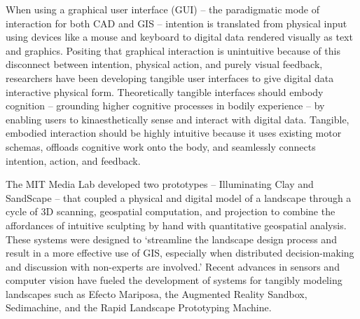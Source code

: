 \documentclass[Afour,sagev,times]{sagej} %
\begin{document}
When using a graphical user interface (GUI) 
-- the paradigmatic mode of interaction for both CAD and GIS --  
intention is translated from physical input 
using devices like a mouse and keyboard 
to digital data rendered visually as text and graphics. 
Positing that graphical interaction is unintuitive
because of this disconnect between 
intention, physical action, and purely visual feedback,
researchers have been developing tangible user interfaces 
to give digital data interactive physical form. 
\cite{Dourish2001,Ishii2008} 
Theoretically tangible interfaces should embody cognition 
-- grounding higher cognitive processes in bodily experience --
by enabling users to kinaesthetically sense and interact with digital data.
\cite{Kirsh2013}
Tangible, embodied interaction should be highly intuitive 
because it uses existing motor schemas,  
offloads cognitive work onto the body,
and seamlessly connects intention, action, and feedback.

The MIT Media Lab developed two prototypes 
-- Illuminating Clay and SandScape -- 
that coupled a physical and digital model of a landscape
through a cycle of 3D scanning, geospatial computation, and projection
to combine the affordances of intuitive sculpting by hand
with quantitative geospatial analysis. \cite{Piper2002a}
These systems were designed to 
`streamline the landscape design process 
and result in a more effective use of GIS, 
especially when distributed decision-making and discussion 
with non-experts are involved.' \cite{Ratti2004}
Recent advances in sensors and computer vision
have fueled the development of 
systems for tangibly modeling landscapes such as 
Efecto Mariposa, \cite{Vivo2011}
the Augmented Reality Sandbox, 
\cite{Kreylos2012,ARsandbox}
Sedimachine, \cite{Cantrell2014} and
the Rapid Landscape Prototyping Machine. \cite{Robinson2014}
\end{document}
